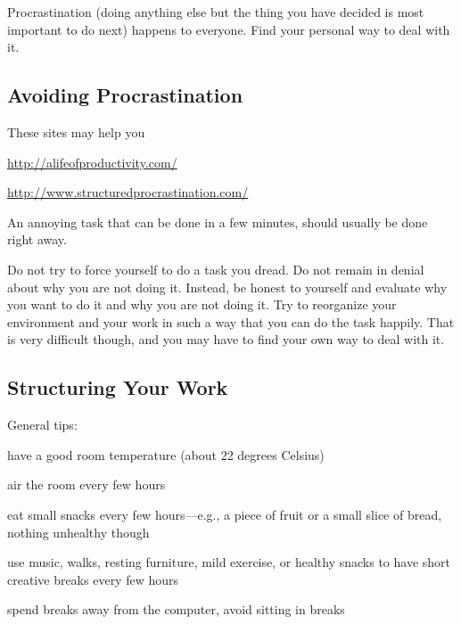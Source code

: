\documentclass[12pt]{article}
\begin{document}
Procrastination (doing anything else but the thing you have decided is most important to do next) happens to everyone.
Find your personal way to deal with it.


\subsection{Avoiding Procrastination}

These sites may help you
\begin{compactitem}
\item \url{http://alifeofproductivity.com/}
\item \url{http://www.structuredprocrastination.com/}
\end{compactitem}
\medskip

An annoying task that can be done in a few minutes, should usually be done right away.
\medskip

Do not try to force yourself to do a task you dread.
Do not remain in denial about why you are not doing it.
Instead, be honest to yourself and evaluate why you want to do it and why you are not doing it.
Try to reorganize your environment and your work in such a way that you can do the task happily.
That is very difficult though, and you may have to find your own way to deal with it.

\subsection{Structuring Your Work}

General tips:
\begin{compactitem}
\item have a good room temperature (about 22 degrees Celsius)
\item air the room every few hours
\item eat small snacks every few hours---e.g., a piece of fruit or a small slice of bread, nothing unhealthy though
\item use music, walks, resting furniture, mild exercise, or healthy snacks to have short creative breaks every few hours
\item spend breaks away from the computer, avoid sitting in breaks
\end{compactitem}
\medskip
\end{document}
